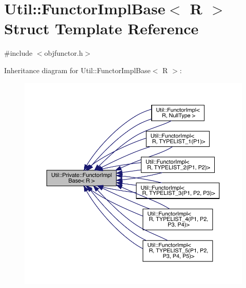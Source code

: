 \hypertarget{structUtil_1_1Private_1_1FunctorImplBase}{}\section{Util\+:\+:Functor\+Impl\+Base$<$ R $>$ Struct Template Reference}
\label{structUtil_1_1Private_1_1FunctorImplBase}


{\ttfamily \#include $<$objfunctor.\+h$>$}



Inheritance diagram for Util\+:\+:Functor\+Impl\+Base$<$ R $>$\+:
\nopagebreak
\begin{figure}[H]
\begin{center}
\leavevmode
\includegraphics[width=350pt]{d1/da4/structUtil_1_1Private_1_1FunctorImplBase__inherit__graph}
\end{center}
\end{figure}
